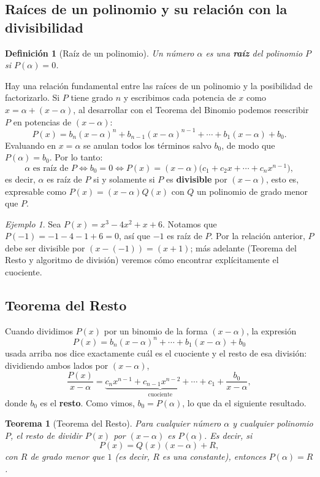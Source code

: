 \documentclass[11pt]{article}
\newtheorem{definicion}{Definición}[section]
\newtheorem{teorema}{Teorema}[section]
\theoremstyle{remark}
\newtheorem*{ejemplo}{Ejemplo}
\begin{document}
\subsection{Raíces de un polinomio y su relación con la divisibilidad}

\begin{definicion}[Raíz de un polinomio]
Un número $\alpha$ es una \textbf{raíz} del polinomio $P$ si $P(\alpha) = 0$.
\end{definicion}

Hay una relación fundamental entre las raíces de un polinomio y la posibilidad
de factorizarlo. Si $P$ tiene grado $n$ y escribimos cada potencia de $x$ como
$x = \alpha + (x-\alpha)$, al desarrollar con el Teorema del Binomio podemos
reescribir $P$ en potencias de $(x-\alpha)$:
$$P(x) = b_n(x-\alpha)^n + b_{n-1}(x-\alpha)^{n-1} + \cdots + b_1(x-\alpha) + b_0.$$
Evaluando en $x = \alpha$ se anulan todos los términos salvo $b_0$, de modo que
$P(\alpha) = b_0$. Por lo tanto:
$$\alpha \text{ es raíz de } P \iff b_0 = 0 \iff P(x) = (x-\alpha)\big(c_1 + c_2 x + \cdots + c_n x^{n-1}\big),$$
es decir, $\alpha$ es raíz de $P$ si y solamente si $P$ es \textbf{divisible} por
$(x-\alpha)$, esto es, expresable como $P(x) = (x-\alpha)Q(x)$ con $Q$ un
polinomio de grado menor que $P$.

\begin{ejemplo}
Sea $P(x) = x^3 - 4x^2 + x + 6$. Notamos que $P(-1) = -1 - 4 - 1 + 6 = 0$, así
que $-1$ es raíz de $P$. Por la relación anterior, $P$ debe ser divisible por
$(x-(-1)) = (x+1)$; más adelante (Teorema del Resto y algoritmo de división)
veremos cómo encontrar explícitamente el cuociente.
\end{ejemplo}

\subsection{Teorema del Resto}

Cuando dividimos $P(x)$ por un binomio de la forma $(x - \alpha)$, la expresión
$$P(x) = b_n(x-\alpha)^n + \cdots + b_1(x-\alpha) + b_0$$
usada arriba nos dice exactamente cuál es el cuociente y el resto de esa
división: dividiendo ambos lados por $(x-\alpha)$,
$$\frac{P(x)}{x-\alpha} = \underbrace{c_n x^{n-1} + c_{n-1}x^{n-2} + \cdots + c_1}_{\text{cuociente}} + \frac{b_0}{x-\alpha},$$
donde $b_0$ es el \textbf{resto}. Como vimos, $b_0 = P(\alpha)$, lo que da el
siguiente resultado.

\begin{teorema}[Teorema del Resto]
Para cualquier número $\alpha$ y cualquier polinomio $P$, el resto de dividir
$P(x)$ por $(x-\alpha)$ es $P(\alpha)$. Es decir, si
$$P(x) = Q(x)(x-\alpha) + R,$$
con $R$ de grado menor que $1$ (es decir, $R$ es una constante), entonces
$P(\alpha) = R$.
\end{teorema}
\end{document}
